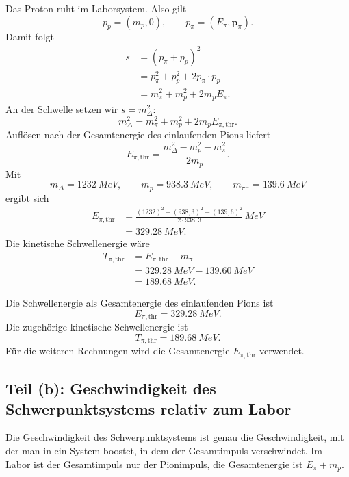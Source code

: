 \documentclass[11pt,a4paper]{scrartcl}
\newcommand{\vect}[1]{\bm{#1}}
\newcommand{\MeV}{\si{MeV}}
\theoremstyle{definition}
\theoremstyle{plain}
\theoremstyle{remark}
\begin{document}
\begin{calculationbox}[title=Auswertung im Laborsystem]
Das Proton ruht im Laborsystem. Also gilt
\[
    p_p=(m_p,0),
    \qquad
    p_\pi=(E_\pi,\vect{p}_\pi).
\]
Damit folgt
\begin{align*}
    s
    &= (p_\pi+p_p)^2 \\
    &= p_\pi^2+p_p^2+2p_\pi\cdot p_p \\
    &= m_\pi^2+m_p^2+2m_pE_\pi.
\end{align*}
An der Schwelle setzen wir $s=m_\Delta^2$:
\[
    m_\Delta^2=m_\pi^2+m_p^2+2m_pE_{\pi,\mathrm{thr}}.
\]
Aufl\"osen nach der Gesamtenergie des einlaufenden Pions liefert
\[
    E_{\pi,\mathrm{thr}}
    =\frac{m_\Delta^2-m_p^2-m_\pi^2}{2m_p}.
\]
Mit
\[
    m_\Delta=\SI{1232}{MeV},\qquad
    m_p=\SI{938,3}{MeV},\qquad
    m_{\pi^-}=\SI{139,6}{MeV}
\]
ergibt sich
\begin{align*}
    E_{\pi,\mathrm{thr}}
    &=\frac{(1232)^2-(938,3)^2-(139,6)^2}{2\cdot 938,3}\,\MeV \\
    &=\SI{329,28}{MeV}.
\end{align*}
Die kinetische Schwellenergie w\"are
\begin{align*}
    T_{\pi,\mathrm{thr}}
    &=E_{\pi,\mathrm{thr}}-m_\pi \\
    &=\SI{329,28}{MeV}-\SI{139,60}{MeV} \\
    &=\SI{189,68}{MeV}.
\end{align*}
\end{calculationbox}

\begin{answerbox}
Die Schwellenergie als Gesamtenergie des einlaufenden Pions ist
\[
    \boxed{E_{\pi,\mathrm{thr}}=\SI{329,28}{MeV}}.
\]
Die zugeh\"orige kinetische Schwellenergie ist
\[
    \boxed{T_{\pi,\mathrm{thr}}=\SI{189,68}{MeV}}.
\]
F\"ur die weiteren Rechnungen wird die Gesamtenergie $E_{\pi,\mathrm{thr}}$ verwendet.
\end{answerbox}

\subsection{Teil (b): Geschwindigkeit des Schwerpunktsystems relativ zum Labor}

\begin{presentationbox}
Die Geschwindigkeit des Schwerpunktsystems ist genau die Geschwindigkeit, mit der man in ein System boostet, in dem der Gesamtimpuls verschwindet. Im Labor ist der Gesamtimpuls nur der Pionimpuls, die Gesamtenergie ist $E_\pi+m_p$.
\end{presentationbox}
\end{document}
